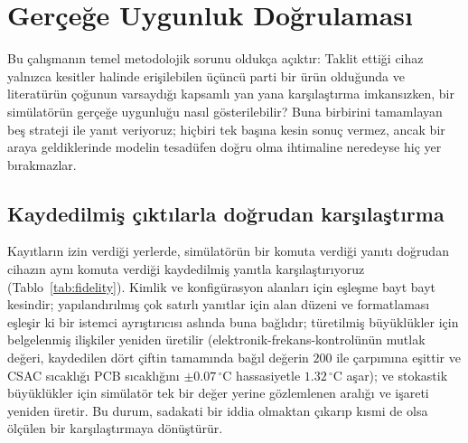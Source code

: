 \documentclass[9pt,twocolumn,a4paper]{extarticle}
\begin{document}
\section{Gerçeğe Uygunluk Doğrulaması}
\label{sec:validation}
Bu çalışmanın temel metodolojik sorunu oldukça açıktır: Taklit ettiği cihaz yalnızca kesitler halinde erişilebilen üçüncü parti bir ürün olduğunda ve literatürün çoğunun varsaydığı kapsamlı yan yana karşılaştırma imkansızken, bir simülatörün gerçeğe uygunluğu nasıl gösterilebilir? Buna birbirini tamamlayan beş strateji ile yanıt veriyoruz; hiçbiri tek başına kesin sonuç vermez, ancak bir araya geldiklerinde modelin tesadüfen doğru olma ihtimaline neredeyse hiç yer bırakmazlar.

\subsection{Kaydedilmiş çıktılarla doğrudan karşılaştırma}
Kayıtların izin verdiği yerlerde, simülatörün bir komuta verdiği yanıtı doğrudan cihazın aynı komuta verdiği kaydedilmiş yanıtla karşılaştırıyoruz (Tablo~\ref{tab:fidelity}). Kimlik ve konfigürasyon alanları için eşleşme bayt bayt kesindir; yapılandırılmış çok satırlı yanıtlar için alan düzeni ve formatlaması eşleşir ki bir istemci ayrıştırıcısı aslında buna bağlıdır; türetilmiş büyüklükler için belgelenmiş ilişkiler yeniden üretilir (elektronik-frekans-kontrolünün mutlak değeri, kaydedilen dört çiftin tamamında bağıl değerin $200$ ile çarpımına eşittir ve CSAC sıcaklığı PCB sıcaklığını $\pm0.07\,^\circ$C hassasiyetle $1.32\,^\circ$C aşar); ve stokastik büyüklükler için simülatör tek bir değer yerine gözlemlenen aralığı ve işareti yeniden üretir. Bu durum, sadakati bir iddia olmaktan çıkarıp kısmi de olsa ölçülen bir karşılaştırmaya dönüştürür.
\end{document}
